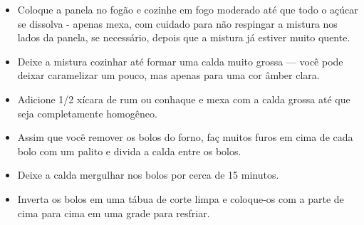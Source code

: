 \documentclass [11pt, letterpaper] {article}
\begin{document}
\begin {description}
\begin {enumerate}
\begin {itemize}
\item Coloque a panela no fogão e cozinhe em fogo moderado até que todo o açúcar se dissolva - apenas mexa, com cuidado para não respingar a mistura nos lados da panela, se necessário, depois que a mistura já estiver muito quente.
\item Deixe a mistura cozinhar até formar uma calda muito grossa --- você pode  deixar caramelizar um pouco, mas apenas para uma cor âmber clara.
\item Adicione 1/2 xícara de rum ou conhaque e mexa com a calda grossa até que seja completamente homogêneo.
\item Assim que você remover os bolos do forno, fa\c{c} muitos furos em cima de cada bolo com um palito e divida a calda entre os bolos.
\item Deixe a calda mergulhar nos bolos por cerca de 15 minutos.
\item Inverta os bolos em uma t\'abua de corte limpa e coloque-os com a parte de cima para cima em uma grade para resfriar.
\end {itemize}
\end {enumerate}
\end {description}
\end{document}
